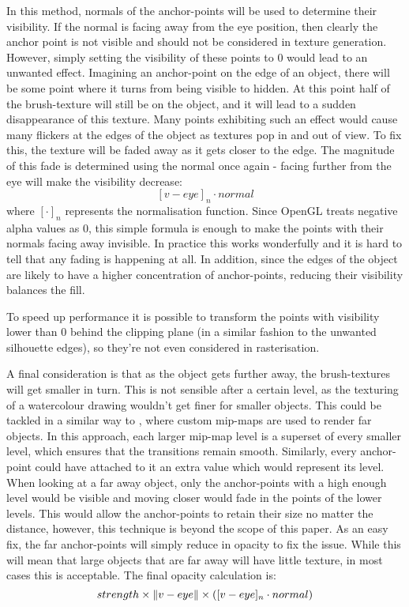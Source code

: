 \documentclass[a4paper, 12pt]{article}
\DeclarePairedDelimiter{\norm}{\lVert}{\rVert}
\begin{document}
In this method, normals of the anchor-points will be used to determine their visibility. If the normal is facing away from the eye position, then clearly the anchor point is not visible and should not be considered in texture generation. However, simply setting the visibility of these points to 0 would lead to an unwanted effect. Imagining an anchor-point on the edge of an object, there will be some point where it turns from being visible to hidden. At this point half of the brush-texture will still be on the object, and it will lead to a sudden disappearance of this texture. Many points exhibiting such an effect would cause many flickers at the edges of the object as textures pop in and out of view. To fix this, the texture will be faded away as it gets closer to the edge. The magnitude of this fade is determined using the normal once again - facing further from the eye will make the visibility decrease:
$$[v-eye]_n \cdot normal$$
where $[\cdot]_n$ represents the normalisation function. Since OpenGL treats negative alpha values as 0, this simple formula is enough to make the points with their normals facing away invisible. In practice this works wonderfully and it is hard to tell that any fading is happening at all. In addition, since the edges of the object are likely to have a higher concentration of anchor-points, reducing their visibility balances the fill.

To speed up performance it is possible to transform the points with visibility lower than 0 behind the clipping plane (in a similar fashion to the unwanted silhouette edges), so they're not even considered in rasterisation.

A final consideration is that as the object gets further away, the brush-textures will get smaller in turn. This is not sensible after a certain level, as the texturing of a watercolour drawing wouldn't get finer for smaller objects. This could be tackled in a similar way to \cite{Praun2001}, where custom mip-maps are used to render far objects. In this approach, each larger mip-map level is a superset of every smaller level, which ensures that the transitions remain smooth. Similarly, every anchor-point could have attached to it an extra value which would represent its level. When looking at a far away object, only the anchor-points with a high enough level would be visible and moving closer would fade in the points of the lower levels. This would allow the anchor-points to retain their size no matter the distance, however, this technique is beyond the scope of this paper. As an easy fix, the far anchor-points will simply reduce in opacity to fix the issue. While this will mean that large objects that are far away will have little texture, in most cases this is acceptable. The final opacity calculation is:
$$strength \times \norm{v-eye} \times ([v-eye]_n \cdot normal)$$
\end{document}
